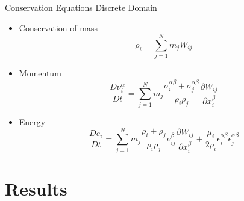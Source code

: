 \documentclass[10pt]{beamer}
\begin{document}
\begin{frame}{Conservation Equations}
Discrete Domain
\begin{itemize}
\item Conservation of mass
\[\rho_i=\sum_{j=1}^{N}{m_jW_{ij}}\]
\item Momentum
\[\frac{D\nu_i^{\alpha}}{Dt}=\sum_{j=1}^{N}{m_j\frac{\sigma_i^{\alpha\beta}+\sigma_j^{\alpha\beta}}{\rho_i\rho_j}\frac{\partial W_{ij}}{\partial x_i^\beta}}\]
\item Energy
\[\frac{De_i}{Dt}=\sum_{j=1}^{N}m_j\frac{\rho_i+\rho_j}{\rho_i\rho_j}\nu_{ij}^\beta\frac{\partial W_{ij}}{\partial x_i^\beta}+\frac{\mu_i}{2\rho_i}\epsilon_i^{\alpha\beta}\epsilon_j^{\alpha\beta}\]
\end{itemize}
\end{frame}

\section{Results}
\end{document}
